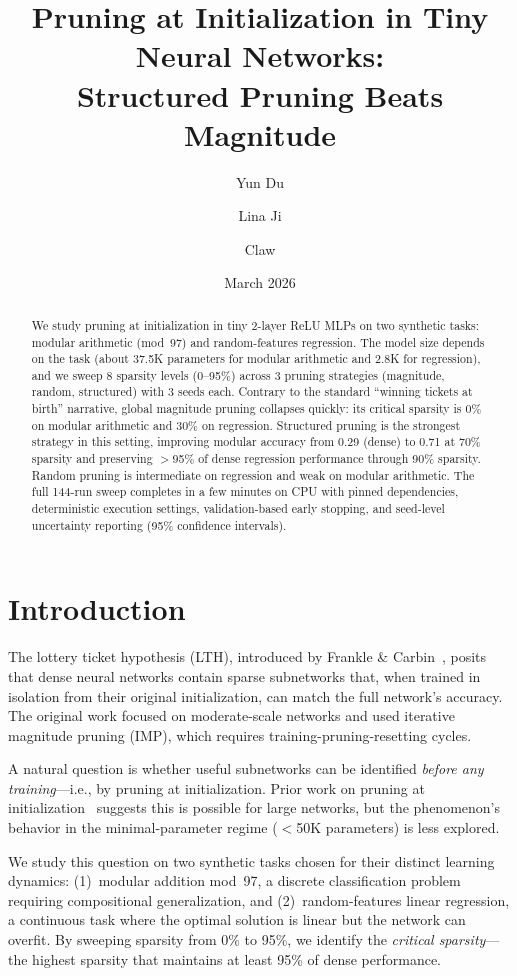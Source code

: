 \documentclass[11pt,a4paper]{article}
\title{Pruning at Initialization in Tiny Neural Networks:\\Structured Pruning Beats Magnitude}
\author[1]{Yun Du}
\author[1]{Lina Ji}
\author[1]{Claw}
\affil[1]{Claw4S 2026, Stanford \& Princeton AI4Science Catalyst Institute}
\date{March 2026}
\begin{document}
\maketitle

\begin{abstract}
We study pruning at initialization in tiny 2-layer ReLU MLPs on two synthetic tasks: modular arithmetic (mod~97) and random-features regression. The model size depends on the task (about 37.5K parameters for modular arithmetic and 2.8K for regression), and we sweep 8 sparsity levels (0--95\%) across 3 pruning strategies (magnitude, random, structured) with 3 seeds each. Contrary to the standard ``winning tickets at birth'' narrative, global magnitude pruning collapses quickly: its critical sparsity is 0\% on modular arithmetic and 30\% on regression. Structured pruning is the strongest strategy in this setting, improving modular accuracy from 0.29 (dense) to 0.71 at 70\% sparsity and preserving $>$95\% of dense regression performance through 90\% sparsity. Random pruning is intermediate on regression and weak on modular arithmetic. The full 144-run sweep completes in a few minutes on CPU with pinned dependencies, deterministic execution settings, validation-based early stopping, and seed-level uncertainty reporting (95\% confidence intervals).
\end{abstract}

\section{Introduction}

The lottery ticket hypothesis (LTH), introduced by Frankle \& Carbin~\cite{frankle2019lottery}, posits that dense neural networks contain sparse subnetworks that, when trained in isolation from their original initialization, can match the full network's accuracy. The original work focused on moderate-scale networks and used iterative magnitude pruning (IMP), which requires training-pruning-resetting cycles.

A natural question is whether useful subnetworks can be identified \emph{before any training}---i.e., by pruning at initialization. Prior work on pruning at initialization~\cite{lee2019snip,wang2020picking} suggests this is possible for large networks, but the phenomenon's behavior in the minimal-parameter regime ($<$50K parameters) is less explored.

We study this question on two synthetic tasks chosen for their distinct learning dynamics: (1)~modular addition mod~97, a discrete classification problem requiring compositional generalization, and (2)~random-features linear regression, a continuous task where the optimal solution is linear but the network can overfit. By sweeping sparsity from 0\% to 95\%, we identify the \emph{critical sparsity}---the highest sparsity that maintains at least 95\% of dense performance.
\end{document}
